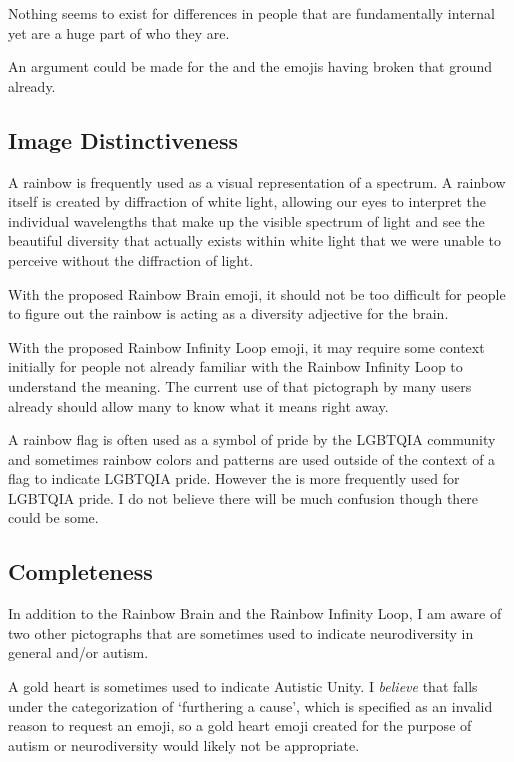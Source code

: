 Nothing seems to exist for differences in people that are fundamentally internal yet are a
huge part of who they are.

An argument could be made for the \nerdface{} and the
\prideflag{} emojis having broken that ground already.

\subsection{Image Distinctiveness}

A rainbow is frequently used as a visual representation of a spectrum. A rainbow itself is
created by diffraction of white light, allowing our eyes to interpret the individual
wavelengths that make up the visible spectrum of light and see the beautiful diversity that
actually exists within white light that we were unable to perceive without the diffraction of
light.

With the proposed Rainbow Brain emoji, it should not be too difficult for people to figure out
the rainbow is acting as a diversity adjective for the brain.

With the proposed Rainbow Infinity Loop emoji, it may require some context initially for people
not already familiar with the Rainbow Infinity Loop to understand the meaning. The current use
of that pictograph by many users already should allow many to know what it means right away.

A rainbow flag is often used as a symbol of pride by the LGBTQIA community and sometimes rainbow colors
and patterns are used outside of the context of a flag to indicate LGBTQIA pride. However the
\prideflag{} is more frequently used for
LGBTQIA pride. I do not believe there will be much confusion though there could be some.

\subsection{Completeness}

In addition to the Rainbow Brain and the Rainbow Infinity Loop, I am aware of two other pictographs
that are sometimes used to indicate neurodiversity in general and/or autism.

A gold heart is sometimes used to indicate Autistic Unity. I \emph{believe} that falls under the
categorization of `furthering a cause', which is specified as an invalid reason to request an emoji,
so a gold heart emoji created for the purpose of autism or neurodiversity would likely not be
appropriate.

